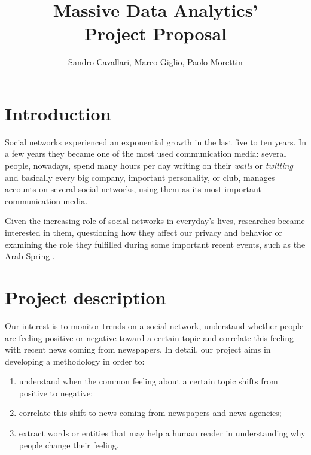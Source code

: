 \documentclass[a4paper]{article}
\begin{document}
\title{Massive Data Analytics'\\Project Proposal}
\author{Sandro Cavallari, Marco Giglio, Paolo Morettin}
\date{}
\maketitle

\section{Introduction}
Social networks experienced an exponential growth in the last five to ten years.
In a few years they became one of the most used communication media:
several people, nowadays, spend many hours per day writing on their
\emph{walls} or \emph{twitting} and basically every big company, important
personality, or club, manages accounts on several social networks, using them as
its most important communication media.

Given the increasing role of social networks in everyday's lives, researches
became interested in them, questioning how they affect our privacy and behavior
\cite{Debatin}\cite{Acar} or examining the role they fulfilled during some
important recent events, such as the Arab Spring \cite{Howard}\cite{Lotan}.

\section{Project description}
Our interest is to monitor trends on a social network, understand whether people
are feeling positive or negative toward a certain topic and correlate this
feeling with recent news coming from newspapers. In detail, our project aims in
developing a methodology in order to:
\begin{enumerate}
\item understand when the common feeling about a certain topic shifts from positive
to negative;
\item correlate this shift to news coming from newspapers and news agencies;
\item extract words or entities that may help a human reader in understanding
why people change their feeling.
\end{enumerate}
\end{document}

